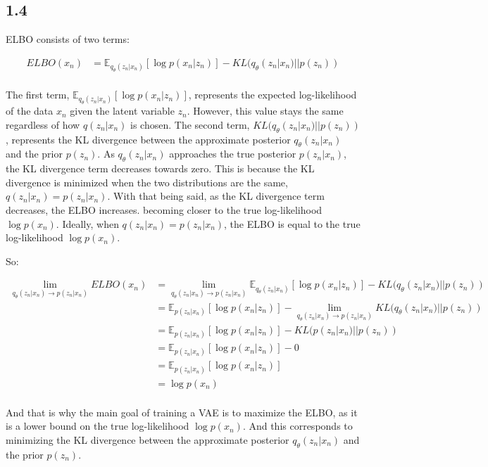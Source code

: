 \documentclass{article}
\begin{document}
\subsection*{1.4}

ELBO consists of two terms: 

\begin{align*}
    ELBO(x_n) &= \mathbb{E}_{q_{\theta}(z_n|x_n)}[\log p(x_n|z_n)] - KL(q_{\theta}(z_n|x_n) || p(z_n)) \\
\end{align*}

The first term, $\mathbb{E}_{q_{\theta}(z_n|x_n)}[\log p(x_n|z_n)]$, represents the expected log-likelihood of the data $x_n$ given the latent variable $z_n$.
However, this value stays the same regardless of how $q(z_n|x_n)$ is chosen.
The second term, $KL(q_{\theta}(z_n|x_n) || p(z_n))$, represents the KL divergence between the approximate posterior $q_{\theta}(z_n|x_n)$ and the prior $p(z_n)$.
As $q_{\theta}(z_n|x_n)$ approaches the true posterior $p(z_n|x_n)$, the KL divergence term decreases towards zero. This
is because the KL divergence is minimized when the two distributions are the same, $q(z_n|x_n) = p(z_n|x_n)$.
With that being said, as the KL divergence term decreases, the ELBO increases. becoming closer to the true log-likelihood $\log p(x_n)$.
Ideally, when $q(z_n|x_n) = p(z_n|x_n)$, the ELBO is equal to the true log-likelihood $\log p(x_n)$.

So: 

\begin{align*}
    \lim_{q_{\theta}(z_n|x_n) \rightarrow p(z_n|x_n)} ELBO(x_n) &= \lim_{q_{\theta}(z_n|x_n) \rightarrow p(z_n|x_n)} \mathbb{E}_{q_{\theta}(z_n|x_n)}[\log p(x_n|z_n)] - KL(q_{\theta}(z_n|x_n) || p(z_n)) \\
    &= \mathbb{E}_{p(z_n|x_n)}[\log p(x_n|z_n)] - \lim_{q_{\theta}(z_n|x_n) \rightarrow p(z_n|x_n)} KL(q_{\theta}(z_n|x_n) || p(z_n)) \\
    &= \mathbb{E}_{p(z_n|x_n)}[\log p(x_n|z_n)] - KL(p(z_n|x_n) || p(z_n)) \\
    &= \mathbb{E}_{p(z_n|x_n)}[\log p(x_n|z_n)] - 0 \\
    &= \mathbb{E}_{p(z_n|x_n)}[\log p(x_n|z_n)] \\
    &= \log p(x_n) \\
\end{align*}

And that is why the main goal of training a VAE is to maximize the ELBO, as it is a lower bound on the true log-likelihood $\log p(x_n)$.
And this corresponds to minimizing the KL divergence between the approximate posterior $q_{\theta}(z_n|x_n)$ and the prior $p(z_n)$.
\end{document}
